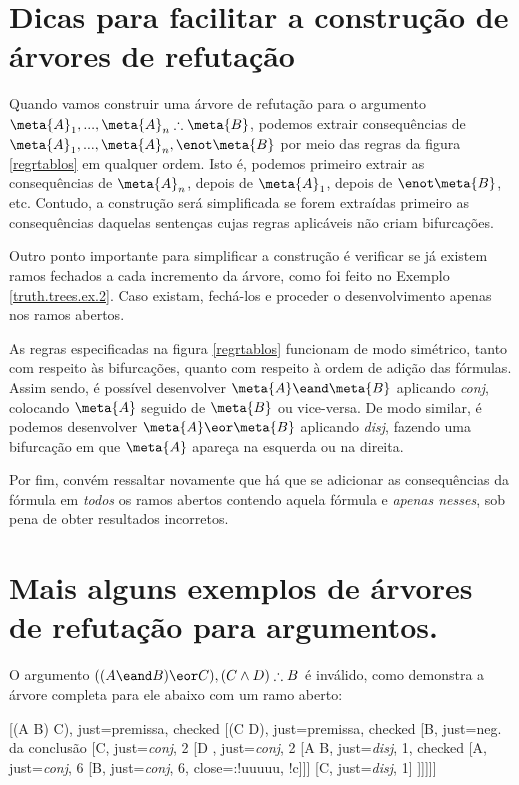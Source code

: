 \section{Dicas para facilitar a construção de árvores de refutação}

Quando vamos construir uma árvore de refutação para o argumento $\meta{A}_1,...,\meta{A}_n \therefore \meta{B}$, podemos extrair consequências de $\meta{A}_1,...,\meta{A}_n, \enot \meta{B}$ por meio das regras da figura \ref{regrtablos} em qualquer ordem.
Isto é, podemos primeiro extrair as consequências de $\meta{A}_n$, depois de $\meta{A}_1$, depois de $\enot \meta{B}$, etc.
Contudo, a construção será simplificada se forem extraídas primeiro as consequências daquelas sentenças cujas regras aplicáveis não criam bifurcações.

Outro ponto importante para simplificar a construção é verificar se já existem ramos fechados a cada incremento da árvore, como foi feito no Exemplo \ref{truth.trees.ex.2}.
Caso existam, fechá-los e proceder o desenvolvimento apenas nos ramos abertos.

As regras especificadas na figura \ref{regrtablos} funcionam de modo simétrico, tanto com respeito às bifurcações, quanto com respeito à ordem de adição das fórmulas.
Assim sendo, é possível desenvolver $\meta{A} \eand \meta{B}$ aplicando \emph{conj}, colocando $\meta{A}$ seguido de $\meta{B}$ ou vice-versa.
De modo similar, é podemos desenvolver $\meta{A} \eor \meta{B}$ aplicando \emph{disj}, fazendo uma bifurcação em que $\meta{A}$ apareça na esquerda ou na direita.

Por fim, convém ressaltar novamente que há que se adicionar as consequências da fórmula em \emph{todos} os ramos abertos contendo aquela fórmula e \emph{apenas nesses}, sob pena de obter resultados incorretos.

\section{Mais alguns exemplos de árvores de refutação para argumentos.}

O argumento $((A \eand B) \eor C), (C \land D) \therefore B$ é inválido, como demonstra a árvore completa para ele abaixo com um ramo aberto:

\begin{center}
\begin{tableau}
	{
}
	[(A \eand B) \eor C), just=premissa, checked
	[(C \land D), just=premissa, checked
	[\enot B, just={neg. da conclusão}
	[C, just={\emph{conj}, 2}
	[D	, just={\emph{conj}, 2}
		[A \eand B, just={\emph{disj}, 1}, checked
			[A, just={\emph{conj}, 6}
			[B, just={\emph{conj}, 6}, close={:!uuuuu, !c}]]]
		[C, just={\emph{disj}, 1}]
		]]]]]
\end{tableau}
\end{center}


